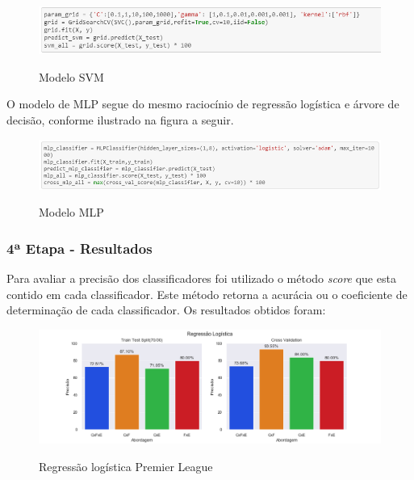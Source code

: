 \begin{figure}[htbp]
  \begin{center}
  \includegraphics[width=1.\linewidth]{imagens/cod_svm.png}\\
  \end{center}
  \caption[Modelo SVM]{Modelo SVM}
  \label{fig:logo}
\end{figure}
	
	O modelo de MLP segue do mesmo raciocínio de regressão logística e árvore de decisão, conforme ilustrado na figura a seguir.
	
\begin{figure}[htbp]
  \begin{center}
  \includegraphics[width=1.\linewidth]{imagens/cod_mlp.png}\\
  \end{center}
  \caption[Modelo MLP]{Modelo MLP}
  \label{fig:logo}
\end{figure}

\subsubsection{4ª Etapa - Resultados}

	Para avaliar a precisão dos classificadores foi utilizado o método \textit{score} que esta contido em cada classificador. Este método retorna a acurácia ou o coeficiente de determinação de cada classificador. Os resultados obtidos foram:
	
\begin{figure}[htbp]
  \begin{center}
  \includegraphics[width=1.05\linewidth]{imagens/resultados/regressao_logistica_pl.png}\\
  \end{center}
  \caption[Regressão logística Premier League]{Regressão logística Premier League}
  \label{fig:logo}
\end{figure}

